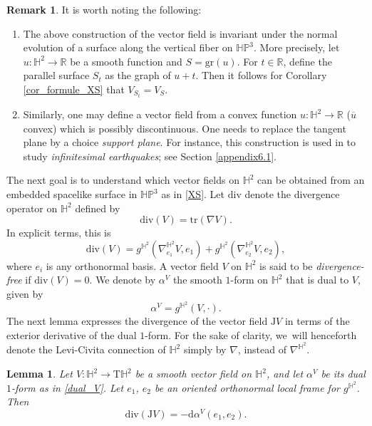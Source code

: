 \documentclass[10pt]{amsart}
\theoremstyle{plain}
\newtheorem{lemma}[cor]{Lemma}
\theoremstyle{definition}
\newtheorem{remark}[cor]{Remark}
\newcommand{\HP}{\mathbb{HP}^3}
\begin{document}
\begin{remark}
It is worth noting the following:
\begin{enumerate}
\item The above construction of the vector field is invariant under the normal evolution of a surface along the vertical fiber on $\HP$. More precisely, let $u:\mathbb{H}^2\to\mathbb{R}$ be a smooth function and $S=\mathrm{gr}(u)$. For $t\in\mathbb{R}$, define the parallel surface $S_t$ as the graph of $u+t$. Then it follows for Corollary \ref{cor_formule_XS} that $V_{S_t}=V_S$.
\item Similarly, one may define a vector field from a convex function $u:\mathbb{H}^2\to\mathbb{R}$ (\ie $\overline{u}$ convex) which is possibly discontinuous. One needs to replace the tangent plane by a choice \emph{support plane}. For instance, this construction is used in \cite{diaf2023Infearth} to study \emph{infinitesimal earthquakes}; see Section \ref{appendix6.1}.
\end{enumerate}
\end{remark}
The next goal is to understand which vector fields on $\mathbb{H}^2$ can be obtained from an embedded spacelike surface in $\HP$ as in \eqref{XS}. Let $\mathrm{div}$ denote the divergence operator on $\mathbb{H}^2$ defined by
\[
\mathrm{div}(V)=\mathrm{tr}(\nabla V).
\]
In explicit terms, this is
\begin{equation}\label{formula_divergence}
\mathrm{div}(V)=g^{\mathbb{H}^2}(\nabla^{\mathbb{H}^2}_{e_1}V,e_1)+g^{\mathbb{H}^2}(\nabla^{\mathbb{H}^2}_{e_2}V,e_2),
\end{equation} where $e_i$ is any orthonormal basis. A vector field \(V \) on \(\mathbb{H}^2 \) is said to be \emph{divergence-free} if \(\mathrm{div}(V) = 0 \).
We denote by \(\alpha^V \) the smooth $1$-form on \(\mathbb{H}^2 \) that is dual to \(V \), given by
\begin{equation}\label{dual_V}
\alpha^V = g^{\mathbb{H}^2}(V, \cdot).
\end{equation}
The next lemma expresses the divergence of the vector field \(\mathrm{J}V \) in terms of the exterior derivative of the dual $1$-form.
For the sake of clarity, we~will henceforth denote the Levi-Civita connection of \(\mathbb{H}^2 \) simply by \(\nabla \), instead of \(\nabla^{\mathbb{H}^2} \).

\begin{lemma}\label{divergence_in_terms_of_forms}
Let \(V: \mathbb{H}^2 \to \mathrm{T}\mathbb{H}^2 \) be a smooth vector field on \(\mathbb{H}^2 \), and let \(\alpha^V \) be its dual $1$-form as in \eqref{dual_V}.
Let \(e_1 \), \(e_2 \) be an oriented orthonormal local frame for \(g^{\mathbb{H}^2} \). Then
\[
\mathrm{div}(\mathrm{J}V) =- \mathrm{d} \alpha^V(e_1, e_2).
\]
\end{lemma}
\end{document}
